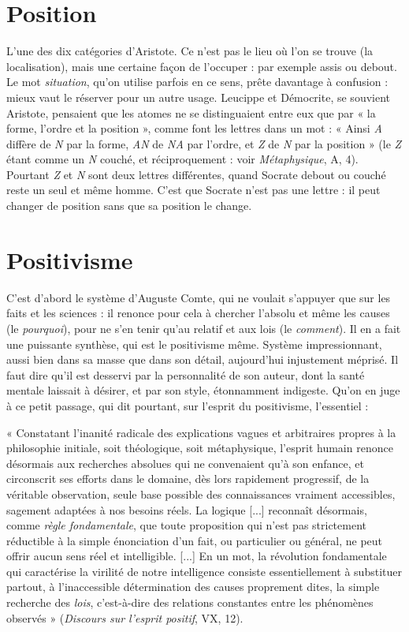 \section{Position}
L'une des dix catégories d’Aristote. Ce n’est pas le lieu où l’on
se trouve (la localisation), mais une certaine façon de l’occuper :
par exemple assis ou debout. Le mot {\it situation}, qu’on utilise parfois en ce sens,
prête davantage à confusion : mieux vaut le réserver pour un autre usage.
Leucippe et Démocrite, se souvient Aristote, pensaient que les atomes ne se
distinguaient entre eux que par « la forme, l’ordre et la position », comme font
les lettres dans un mot : « Ainsi {\it A} diffère de {\it N} par la forme, {\it AN} de {\it NA} par
l’ordre, et {\it Z} de {\it N} par la position » (le {\it Z} étant comme un {\it N} couché, et
réciproquement : voir {\it Métaphysique}, A, 4). Pourtant {\it Z} et {\it N} sont deux lettres
différentes, quand Socrate debout ou couché reste un seul et même homme.
C’est que Socrate n’est pas une lettre : il peut changer de position sans que sa
position le change.

\section{Positivisme}
C’est d’abord le système d’Auguste Comte, qui ne voulait
s'appuyer que sur les faits et les sciences : il renonce pour
cela à chercher l'absolu et même les causes (le {\it pourquoi}), pour ne s’en tenir
qu’au relatif et aux lois (le {\it comment}). Il en a fait une puissante synthèse, qui est
le positivisme même. Système impressionnant, aussi bien dans sa masse que
dans son détail, aujourd’hui injustement méprisé. Il faut dire qu’il est desservi
par la personnalité de son auteur, dont la santé mentale laissait à désirer, et par
son style, étonnamment indigeste. Qu’on en juge à ce petit passage, qui dit
pourtant, sur l'esprit du positivisme, l'essentiel :

\vspace{0.5cm}

{\footnotesize 
« Constatant l’inanité radicale des explications vagues et arbitraires propres à la philosophie
initiale, soit théologique, soit métaphysique, l'esprit humain renonce désormais
aux recherches absolues qui ne convenaient qu’à son enfance, et circonscrit ses
efforts dans le domaine, dès lors rapidement progressif, de la véritable observation,
seule base possible des connaissances vraiment accessibles, sagement adaptées à nos
besoins réels. La logique [...] reconnaît désormais, comme {\it règle fondamentale}, que
toute proposition qui n’est pas strictement réductible à la simple énonciation d’un fait,
ou particulier ou général, ne peut offrir aucun sens réel et intelligible. [...] En un mot,
la révolution fondamentale qui caractérise la virilité de notre intelligence consiste essentiellement
à substituer partout, à l’inaccessible détermination des causes proprement
dites, la simple recherche des {\it lois}, c’est-à-dire des relations constantes entre les phénomènes
observés » ({\it Discours sur l'esprit positif}, VX, 12).
}


